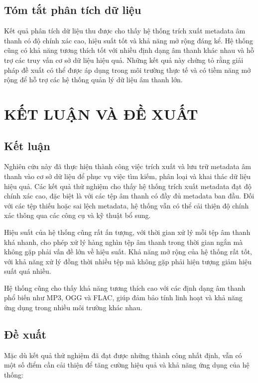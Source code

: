 \documentclass[conference]{IEEEtran}
\begin{document}
\subsection{Tóm tắt phân tích dữ liệu}
Kết quả phân tích dữ liệu thu được cho thấy hệ thống trích xuất metadata âm thanh có độ chính xác cao, hiệu suất tốt và khả năng mở rộng đáng kể. Hệ thống cũng có khả năng tương thích tốt với nhiều định dạng âm thanh khác nhau và hỗ trợ các truy vấn cơ sở dữ liệu hiệu quả. Những kết quả này chứng tỏ rằng giải pháp đề xuất có thể được áp dụng trong môi trường thực tế và có tiềm năng mở rộng để hỗ trợ các hệ thống quản lý dữ liệu âm thanh lớn.



\section{KẾT LUẬN VÀ ĐỀ XUẤT}

\subsection{Kết luận}
Nghiên cứu này đã thực hiện thành công việc trích xuất và lưu trữ metadata âm thanh vào cơ sở dữ liệu để phục vụ việc tìm kiếm, phân loại và khai thác dữ liệu hiệu quả. Các kết quả thử nghiệm cho thấy hệ thống trích xuất metadata đạt độ chính xác cao, đặc biệt là với các tệp âm thanh có đầy đủ metadata ban đầu. Đối với các tệp thiếu hoặc sai lệch metadata, hệ thống vẫn có thể cải thiện độ chính xác thông qua các công cụ và kỹ thuật bổ sung.

Hiệu suất của hệ thống cũng rất ấn tượng, với thời gian xử lý mỗi tệp âm thanh khá nhanh, cho phép xử lý hàng nghìn tệp âm thanh trong thời gian ngắn mà không gặp phải vấn đề lớn về hiệu suất. Khả năng mở rộng của hệ thống rất tốt, với khả năng xử lý đồng thời nhiều tệp mà không gặp phải hiện tượng giảm hiệu suất quá nhiều.

Hệ thống cũng cho thấy khả năng tương thích cao với các định dạng âm thanh phổ biến như MP3, OGG và FLAC, giúp đảm bảo tính linh hoạt và khả năng ứng dụng trong nhiều môi trường khác nhau.

\subsection{Đề xuất}
Mặc dù kết quả thử nghiệm đã đạt được những thành công nhất định, vẫn có một số điểm cần cải thiện để tăng cường hiệu quả và khả năng ứng dụng của hệ thống:
\end{document}

